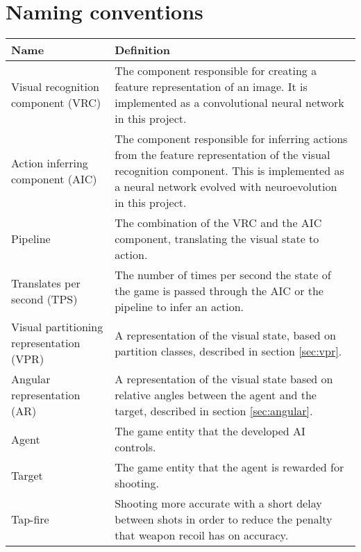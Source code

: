 
\section{Naming conventions}

\begin{table}[H]
\begin{center}

\begin{tabularx}{\textwidth}{ | l | X |}
		\hline
	
		\textbf{Name} & \textbf{Definition} \\ \hline
		Visual recognition component (VRC) & The component responsible for creating a feature representation of an image. It is implemented as a convolutional neural network in this project. \\ \hline
		Action inferring component (AIC) & The component responsible for inferring actions from the feature representation of the visual recognition component. This is implemented as a neural network evolved with neuroevolution in this project. \\ \hline
		
		Pipeline & The combination of the VRC and the AIC component, translating the visual state to action. \\ \hline
		
Translates per second (TPS) & The number of times per second the state of the game is passed through the AIC or the pipeline to infer an action.\\ \hline		
		
		Visual partitioning representation (VPR) & A representation of the visual state, based on partition classes, described in section \ref{sec:vpr}. \\ \hline
		
		Angular representation (AR) & A representation of the visual state based on relative angles between the agent and the target, described in section \ref{sec:angular}. \\ \hline
		Agent & The game entity that the developed AI controls. \\ \hline
		Target & The game entity that the agent is rewarded for shooting. \\ \hline
		
		Tap-fire & Shooting more accurate with a short delay between shots in order to reduce the penalty that weapon recoil has on accuracy. \\ \hline
		
		
\end{tabularx}
\end{center}
\label{tab:naming-conventions} 
\end{table}

\newpage